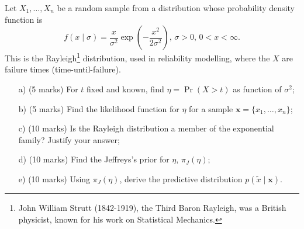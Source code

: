 \documentclass[a4paper,10pt, notitlepage]{report}
\newcommand{\pr}{\operatorname{Pr}} %
\begin{document}
Let $X_1, \ldots, X_n$ be a random sample from a distribution whose probability density function is
\begin{equation*}
 f(x \mid \sigma) = \frac{x}{\sigma^2} \exp\left(-\frac{x^2}{2\sigma^2}\right),\, \sigma>0,\, 0 < x < \infty.
\end{equation*}
This is the Rayleigh\footnote{John William Strutt (1842-1919), the Third Baron Rayleigh, was a British physicist, known for his work on Statistical Mechanics.} distribution, used in reliability modelling, where the $X$ are failure times (time-until-failure).
\begin{itemize}
 \item[a)] (5 marks) For $t$ fixed and known, find $\eta = \pr(X > t)$ as function of $\sigma^2$;
 \item[b)] (5 marks) Find the likelihood function for $\eta$ for a sample $\boldsymbol{x} = \{x_1, \ldots, x_n\}$;
 \item[c)] (10 marks) Is the Rayleigh distribution a member of the exponential family? Justify your answer;
 \item[d)] (10 marks) Find the Jeffreys's prior for $\eta$, $\pi_J(\eta)$;
 \item[e)] (10 marks) Using $\pi_J(\eta)$, derive the predictive distribution $p(\tilde{x} \mid \boldsymbol{x})$.
\end{itemize}



\end{document}
